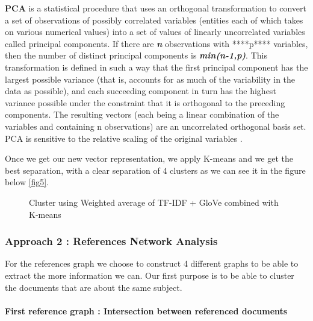 \documentclass[article,twocolumn]{IEEEtran}
\begin{document}
\textbf{PCA} is a statistical procedure that uses an orthogonal
transformation to convert a set of observations of possibly correlated
variables (entities each of which takes on various numerical values)
into a set of values of linearly uncorrelated variables called principal
components. If there are \textbf{\emph{n}} observations with ****p****
variables, then the number of distinct principal components is
\textbf{\emph{min(n-1,p)}}. This transformation is defined in such a way
that the first principal component has the largest possible variance
(that is, accounts for as much of the variability in the data as
possible), and each succeeding component in turn has the highest
variance possible under the constraint that it is orthogonal to the
preceding components. The resulting vectors (each being a linear
combination of the variables and containing n observations) are an
uncorrelated orthogonal basis set. PCA is sensitive to the relative
scaling of the original variables \cite{PCA}.

Once we get our new vector representation, we apply K-means and we get
the best separation, with a clear separation of 4 clusters as we can see
it in the figure below \ref{fig5}.


    \begin{figure}
        \begin{center}\end{center}
        \caption{Cluster using Weighted average of TF-IDF + GloVe  combined with K-means }
        \label{fig}
    \end{figure}
    
    \hypertarget{approach-2-references-network-analysis}{%
\subsubsection{Approach 2 : References Network
Analysis}\label{approach-2-references-network-analysis}}

For the references graph we choose to construct 4 different graphs to be
able to extract the more information we can. Our first purpose is to be
able to cluster the documents that are about the same subject.

    \hypertarget{first-reference-graph-intersection-between-referenced-documents}{%
\paragraph{First reference graph : Intersection between referenced
documents}\label{first-reference-graph-intersection-between-referenced-documents}}
\end{document}
